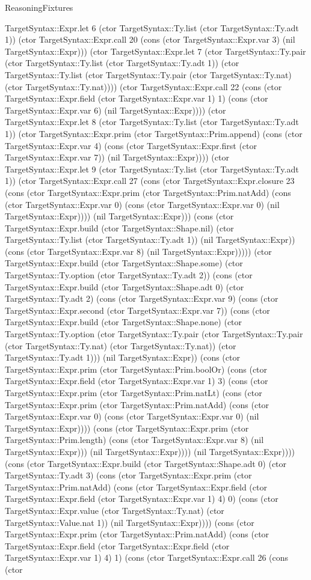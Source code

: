 \begin{lexlean}{ReasoningFixtures}
\begin{semanticmodule}
{TargetSyntax::Expr.let 6 (ctor TargetSyntax::Ty.list (ctor TargetSyntax::Ty.adt 1)) (ctor TargetSyntax::Expr.call 20 (cons (ctor TargetSyntax::Expr.var 3) (nil TargetSyntax::Expr))) (ctor TargetSyntax::Expr.let 7 (ctor TargetSyntax::Ty.pair (ctor TargetSyntax::Ty.list (ctor TargetSyntax::Ty.adt 1)) (ctor TargetSyntax::Ty.list (ctor TargetSyntax::Ty.pair (ctor TargetSyntax::Ty.nat) (ctor TargetSyntax::Ty.nat)))) (ctor TargetSyntax::Expr.call 22 (cons (ctor TargetSyntax::Expr.field (ctor TargetSyntax::Expr.var 1) 1) (cons (ctor TargetSyntax::Expr.var 6) (nil TargetSyntax::Expr)))) (ctor TargetSyntax::Expr.let 8 (ctor TargetSyntax::Ty.list (ctor TargetSyntax::Ty.adt 1)) (ctor TargetSyntax::Expr.prim (ctor TargetSyntax::Prim.append) (cons (ctor TargetSyntax::Expr.var 4) (cons (ctor TargetSyntax::Expr.first (ctor TargetSyntax::Expr.var 7)) (nil TargetSyntax::Expr)))) (ctor TargetSyntax::Expr.let 9 (ctor TargetSyntax::Ty.list (ctor TargetSyntax::Ty.adt 1)) (ctor TargetSyntax::Expr.call 27 (cons (ctor TargetSyntax::Expr.closure 23 (cons (ctor TargetSyntax::Expr.prim (ctor TargetSyntax::Prim.natAdd) (cons (ctor TargetSyntax::Expr.var 0) (cons (ctor TargetSyntax::Expr.var 0) (nil TargetSyntax::Expr)))) (nil TargetSyntax::Expr))) (cons (ctor TargetSyntax::Expr.build (ctor TargetSyntax::Shape.nil) (ctor TargetSyntax::Ty.list (ctor TargetSyntax::Ty.adt 1)) (nil TargetSyntax::Expr)) (cons (ctor TargetSyntax::Expr.var 8) (nil TargetSyntax::Expr))))) (ctor TargetSyntax::Expr.build (ctor TargetSyntax::Shape.some) (ctor TargetSyntax::Ty.option (ctor TargetSyntax::Ty.adt 2)) (cons (ctor TargetSyntax::Expr.build (ctor TargetSyntax::Shape.adt 0) (ctor TargetSyntax::Ty.adt 2) (cons (ctor TargetSyntax::Expr.var 9) (cons (ctor TargetSyntax::Expr.second (ctor TargetSyntax::Expr.var 7)) (cons (ctor TargetSyntax::Expr.build (ctor TargetSyntax::Shape.none) (ctor TargetSyntax::Ty.option (ctor TargetSyntax::Ty.pair (ctor TargetSyntax::Ty.pair (ctor TargetSyntax::Ty.nat) (ctor TargetSyntax::Ty.nat)) (ctor TargetSyntax::Ty.adt 1))) (nil TargetSyntax::Expr)) (cons (ctor TargetSyntax::Expr.prim (ctor TargetSyntax::Prim.boolOr) (cons (ctor TargetSyntax::Expr.field (ctor TargetSyntax::Expr.var 1) 3) (cons (ctor TargetSyntax::Expr.prim (ctor TargetSyntax::Prim.natLt) (cons (ctor TargetSyntax::Expr.prim (ctor TargetSyntax::Prim.natAdd) (cons (ctor TargetSyntax::Expr.var 0) (cons (ctor TargetSyntax::Expr.var 0) (nil TargetSyntax::Expr)))) (cons (ctor TargetSyntax::Expr.prim (ctor TargetSyntax::Prim.length) (cons (ctor TargetSyntax::Expr.var 8) (nil TargetSyntax::Expr))) (nil TargetSyntax::Expr)))) (nil TargetSyntax::Expr)))) (cons (ctor TargetSyntax::Expr.build (ctor TargetSyntax::Shape.adt 0) (ctor TargetSyntax::Ty.adt 3) (cons (ctor TargetSyntax::Expr.prim (ctor TargetSyntax::Prim.natAdd) (cons (ctor TargetSyntax::Expr.field (ctor TargetSyntax::Expr.field (ctor TargetSyntax::Expr.var 1) 4) 0) (cons (ctor TargetSyntax::Expr.value (ctor TargetSyntax::Ty.nat) (ctor TargetSyntax::Value.nat 1)) (nil TargetSyntax::Expr)))) (cons (ctor TargetSyntax::Expr.prim (ctor TargetSyntax::Prim.natAdd) (cons (ctor TargetSyntax::Expr.field (ctor TargetSyntax::Expr.field (ctor TargetSyntax::Expr.var 1) 4) 1) (cons (ctor TargetSyntax::Expr.call 26 (cons (ctor }
\end{semanticmodule}
\end{lexlean}
